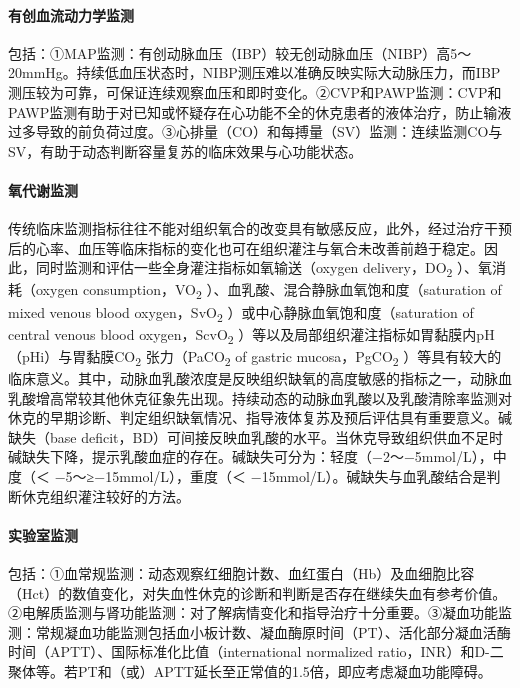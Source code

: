 \paragraph{有创血流动力学监测}

包括：①MAP监测：有创动脉血压（IBP）较无创动脉血压（NIBP）高5～20mmHg。持续低血压状态时，NIBP测压难以准确反映实际大动脉压力，而IBP测压较为可靠，可保证连续观察血压和即时变化。②CVP和PAWP监测：CVP和PAWP监测有助于对已知或怀疑存在心功能不全的休克患者的液体治疗，防止输液过多导致的前负荷过度。③心排量（CO）和每搏量（SV）监测：连续监测CO与SV，有助于动态判断容量复苏的临床效果与心功能状态。

\paragraph{氧代谢监测}

传统临床监测指标往往不能对组织氧合的改变具有敏感反应，此外，经过治疗干预后的心率、血压等临床指标的变化也可在组织灌注与氧合未改善前趋于稳定。因此，同时监测和评估一些全身灌注指标如氧输送（oxygen
delivery，DO\textsubscript{2} ）、氧消耗（oxygen
consumption，VO\textsubscript{2}
）、血乳酸、混合静脉血氧饱和度（saturation of mixed venous blood
oxygen，SvO\textsubscript{2} ）或中心静脉血氧饱和度（saturation of
central venous blood oxygen，ScvO\textsubscript{2}
）等以及局部组织灌注指标如胃黏膜内pH（pHi）与胃黏膜CO\textsubscript{2}
张力（PaCO\textsubscript{2} of gastric mucosa，PgCO\textsubscript{2}
）等具有较大的临床意义。其中，动脉血乳酸浓度是反映组织缺氧的高度敏感的指标之一，动脉血乳酸增高常较其他休克征象先出现。持续动态的动脉血乳酸以及乳酸清除率监测对休克的早期诊断、判定组织缺氧情况、指导液体复苏及预后评估具有重要意义。碱缺失（base
deficit，BD）可间接反映血乳酸的水平。当休克导致组织供血不足时碱缺失下降，提示乳酸血症的存在。碱缺失可分为：轻度（−2～−5mmol/L），中度（＜
−5～≥−15mmol/L），重度（＜
−15mmol/L）。碱缺失与血乳酸结合是判断休克组织灌注较好的方法。

\paragraph{实验室监测}

包括：①血常规监测：动态观察红细胞计数、血红蛋白（Hb）及血细胞比容（Hct）的数值变化，对失血性休克的诊断和判断是否存在继续失血有参考价值。②电解质监测与肾功能监测：对了解病情变化和指导治疗十分重要。③凝血功能监测：常规凝血功能监测包括血小板计数、凝血酶原时间（PT）、活化部分凝血活酶时间（APTT）、国际标准化比值（international
normalized
ratio，INR）和D-二聚体等。若PT和（或）APTT延长至正常值的1.5倍，即应考虑凝血功能障碍。

